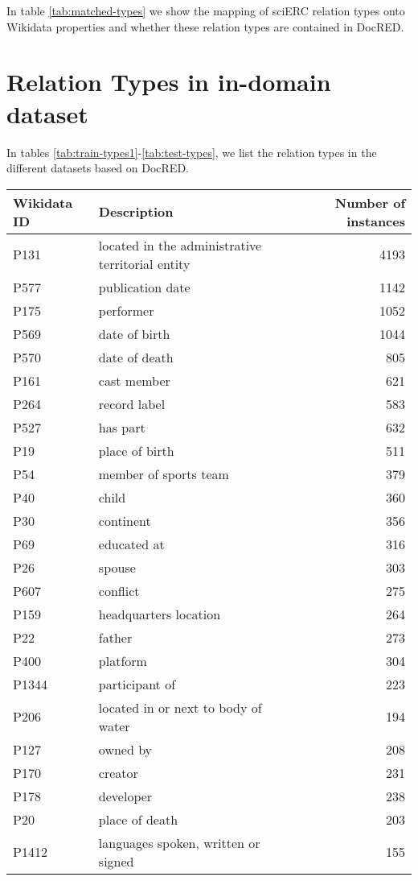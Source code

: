 \documentclass[11pt]{article}
\begin{document}
In table \ref{tab:matched-types} we show the mapping of sciERC relation types onto Wikidata \cite{vrandecic_wikidata_2014} properties and whether these relation types are contained in DocRED.

\section{Relation Types in in-domain dataset}
\label{sec:types}

In tables \ref{tab:train-types1}-\ref{tab:test-types}, we list the relation types in the different datasets based on DocRED.

\begin{table*}
\centering
\begin{tabular}{llr}
\hline
Wikidata ID & Description & Number of instances\\
\hline
P131 & located in the administrative territorial entity & 4193\\
P577 & publication date & 1142\\
P175 & performer & 1052\\
P569 & date of birth & 1044\\
P570 & date of death & 805\\
P161 & cast member & 621\\
P264 & record label & 583\\
P527 & has part & 632\\
P19 & place of birth & 511\\
P54 & member of sports team & 379\\
P40 & child & 360\\
P30 & continent & 356\\
P69 & educated at & 316\\
P26 & spouse & 303\\
P607 & conflict & 275\\
P159 & headquarters location & 264\\
P22 & father & 273\\
P400 & platform & 304\\
P1344 & participant of & 223\\
P206 & located in or next to body of water & 194\\
P127 & owned by & 208\\
P170 & creator & 231\\
P178 & developer & 238\\
P20 & place of death & 203\\
P1412 & languages spoken, written or signed & 155\\

\end{tabular}
\end{table*}
\end{document}
